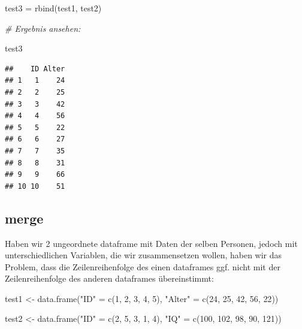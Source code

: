 \documentclass[
]{book}
\newenvironment{Shaded}{\begin{snugshade}}{\end{snugshade}}
\newcommand{\CommentTok}[1]{\textcolor[rgb]{0.56,0.35,0.01}{\textit{#1}}}
\newcommand{\DecValTok}[1]{\textcolor[rgb]{0.00,0.00,0.81}{#1}}
\newcommand{\FunctionTok}[1]{\textcolor[rgb]{0.00,0.00,0.00}{#1}}
\newcommand{\NormalTok}[1]{#1}
\newcommand{\OtherTok}[1]{\textcolor[rgb]{0.56,0.35,0.01}{#1}}
\newcommand{\StringTok}[1]{\textcolor[rgb]{0.31,0.60,0.02}{#1}}
\begin{document}
\begin{Shaded}
\begin{Highlighting}[]
\NormalTok{test3 }\OtherTok{=} \FunctionTok{rbind}\NormalTok{(test1, test2)}

\CommentTok{\# Ergebnis ansehen:}

\NormalTok{test3}
\end{Highlighting}
\end{Shaded}

\begin{verbatim}
##    ID Alter
## 1   1    24
## 2   2    25
## 3   3    42
## 4   4    56
## 5   5    22
## 6   6    27
## 7   7    35
## 8   8    31
## 9   9    66
## 10 10    51
\end{verbatim}

\hypertarget{merge}{%
\subsection{merge}\label{merge}}

Haben wir 2 ungeordnete dataframe mit Daten der selben Personen, jedoch mit unterschiedlichen Variablen, die wir zusammensetzen wollen, haben wir das Problem, dass die Zeilenreihenfolge des einen dataframes ggf. nicht mit der Zeilenreihenfolge des anderen dataframes übereinstimmt:

\begin{Shaded}
\begin{Highlighting}[]
\NormalTok{test1 }\OtherTok{\textless{}{-}} \FunctionTok{data.frame}\NormalTok{(}\StringTok{"ID"} \OtherTok{=} \FunctionTok{c}\NormalTok{(}\DecValTok{1}\NormalTok{, }\DecValTok{2}\NormalTok{, }\DecValTok{3}\NormalTok{, }\DecValTok{4}\NormalTok{, }\DecValTok{5}\NormalTok{),}
                    \StringTok{"Alter"} \OtherTok{=} \FunctionTok{c}\NormalTok{(}\DecValTok{24}\NormalTok{, }\DecValTok{25}\NormalTok{, }\DecValTok{42}\NormalTok{, }\DecValTok{56}\NormalTok{, }\DecValTok{22}\NormalTok{))}

\NormalTok{test2 }\OtherTok{\textless{}{-}} \FunctionTok{data.frame}\NormalTok{(}\StringTok{"ID"} \OtherTok{=} \FunctionTok{c}\NormalTok{(}\DecValTok{2}\NormalTok{, }\DecValTok{5}\NormalTok{, }\DecValTok{3}\NormalTok{, }\DecValTok{1}\NormalTok{, }\DecValTok{4}\NormalTok{),}
                    \StringTok{"IQ"} \OtherTok{=} \FunctionTok{c}\NormalTok{(}\DecValTok{100}\NormalTok{, }\DecValTok{102}\NormalTok{, }\DecValTok{98}\NormalTok{, }\DecValTok{90}\NormalTok{, }\DecValTok{121}\NormalTok{))}
\end{Highlighting}
\end{Shaded}
\end{document}

